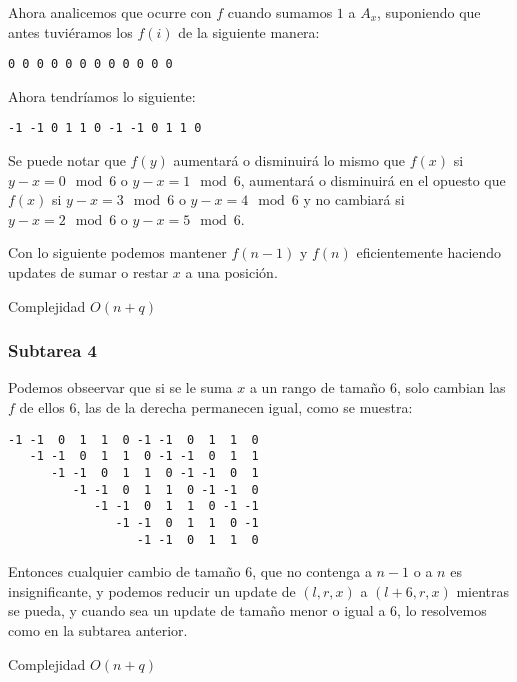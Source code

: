 Ahora analicemos que ocurre con \(f\) cuando sumamos \(1\) a \(A_x\),
suponiendo que antes tuviéramos los \(f(i)\) de la siguiente manera:

\begin{verbatim}
0 0 0 0 0 0 0 0 0 0 0 0
\end{verbatim}

Ahora tendríamos lo siguiente:

\begin{verbatim}
-1 -1 0 1 1 0 -1 -1 0 1 1 0
\end{verbatim}

Se puede notar que \(f(y)\) aumentará o disminuirá lo mismo que \(f(x)\)
si \(y - x = 0\mod{6}\) o \(y - x = 1\mod{6}\), aumentará o disminuirá
en el opuesto que \(f(x)\) si \(y - x = 3\mod{6}\) o
\(y - x = 4\mod{6}\) y no cambiará si \(y - x = 2\mod{6}\) o
\(y - x = 5\mod{6}\).

Con lo siguiente podemos mantener \(f(n-1)\) y \(f(n)\) eficientemente
haciendo updates de sumar o restar \(x\) a una posición.

Complejidad \(O(n+q)\)

\hypertarget{subtarea-4}{%
\subsubsection{Subtarea 4}\label{subtarea-4}}

Podemos obseervar que si se le suma \(x\) a un rango de tamaño \(6\),
solo cambian las \(f\) de ellos \(6\), las de la derecha permanecen
igual, como se muestra:

\begin{verbatim}
-1 -1  0  1  1  0 -1 -1  0  1  1  0
   -1 -1  0  1  1  0 -1 -1  0  1  1
      -1 -1  0  1  1  0 -1 -1  0  1
         -1 -1  0  1  1  0 -1 -1  0
            -1 -1  0  1  1  0 -1 -1
               -1 -1  0  1  1  0 -1
                  -1 -1  0  1  1  0
\end{verbatim}

Entonces cualquier cambio de tamaño \(6\), que no contenga a \(n-1\) o a
\(n\) es insignificante, y podemos reducir un update de \((l,r,x)\) a
\((l+6,r,x)\) mientras se pueda, y cuando sea un update de tamaño menor
o igual a \(6\), lo resolvemos como en la subtarea anterior.

Complejidad \(O(n+q)\)
